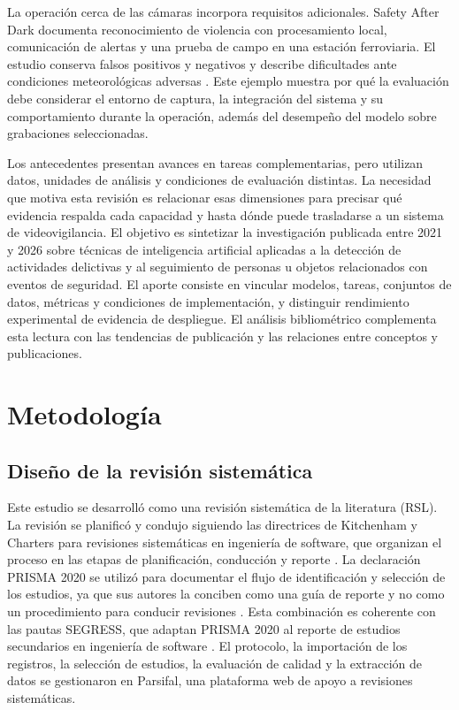 \documentclass[pdflatex,sn-mathphys-num]{sn-jnl}%
\theoremstyle{thmstyleone}%
\theoremstyle{thmstyletwo}%
\theoremstyle{thmstylethree}%
\begin{document}
La operación cerca de las cámaras incorpora requisitos adicionales. Safety After Dark documenta reconocimiento de violencia con procesamiento local, comunicación de alertas y una prueba de campo en una estación ferroviaria. El estudio conserva falsos positivos y negativos y describe dificultades ante condiciones meteorológicas adversas \cite{barthelemy2024}. Este ejemplo muestra por qué la evaluación debe considerar el entorno de captura, la integración del sistema y su comportamiento durante la operación, además del desempeño del modelo sobre grabaciones seleccionadas.

Los antecedentes presentan avances en tareas complementarias, pero utilizan datos, unidades de análisis y condiciones de evaluación distintas. La necesidad que motiva esta revisión es relacionar esas dimensiones para precisar qué evidencia respalda cada capacidad y hasta dónde puede trasladarse a un sistema de videovigilancia. El objetivo es sintetizar la investigación publicada entre 2021 y 2026 sobre técnicas de inteligencia artificial aplicadas a la detección de actividades delictivas y al seguimiento de personas u objetos relacionados con eventos de seguridad. El aporte consiste en vincular modelos, tareas, conjuntos de datos, métricas y condiciones de implementación, y distinguir rendimiento experimental de evidencia de despliegue. El análisis bibliométrico complementa esta lectura con las tendencias de publicación y las relaciones entre conceptos y publicaciones.


\section{Metodología}\label{sec2}

\subsection{Diseño de la revisión sistemática}\label{subsec:diseno}

Este estudio se desarrolló como una revisión sistemática de la literatura (RSL). La revisión se planificó y condujo siguiendo las directrices de Kitchenham y Charters para revisiones sistemáticas en ingeniería de software, que organizan el proceso en las etapas de planificación, conducción y reporte \cite{kitchenham2007}. La declaración PRISMA 2020 se utilizó para documentar el flujo de identificación y selección de los estudios, ya que sus autores la conciben como una guía de reporte y no como un procedimiento para conducir revisiones \cite{page2021}. Esta combinación es coherente con las pautas SEGRESS, que adaptan PRISMA 2020 al reporte de estudios secundarios en ingeniería de software \cite{kitchenham2023}. El protocolo, la importación de los registros, la selección de estudios, la evaluación de calidad y la extracción de datos se gestionaron en Parsifal, una plataforma web de apoyo a revisiones sistemáticas.
\end{document}
